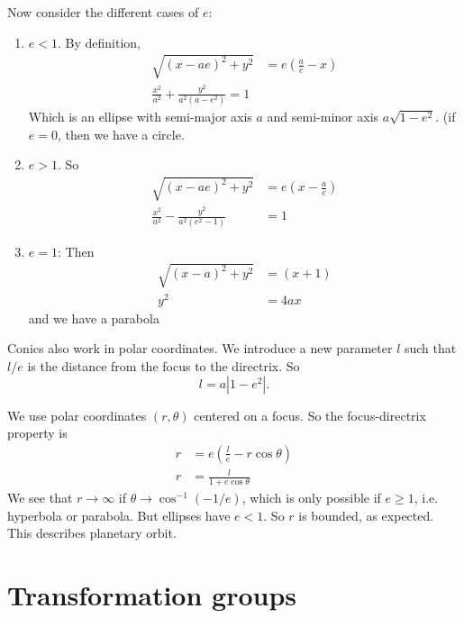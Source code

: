 \documentclass[a4paper]{article}
\begin{document}
Now consider the different cases of $e$:
\begin{enumerate}
\item $e < 1$. By definition,
  \begin{align*}
    \sqrt{(x - ae)^2 + y^2} &= e(\frac{a}{e} - x)\\
    \frac{x^2}{a^2} + \frac{y^2}{a^2(a - e^2)} = 1
  \end{align*}
  Which is an ellipse with semi-major axis $a$ and semi-minor axis $a\sqrt{1 - e^2}$. (if $e = 0$, then we have a circle.
\newpage %
\item $e > 1$. So
  \begin{align*}
    \sqrt{(x - ae)^2 + y^2} &= e(x - \frac{a}{e})\\
    \frac{x^2}{a^2} - \frac{y^2}{a^2(e^2 - 1)} &= 1
  \end{align*}
\item $e = 1$: Then
  \begin{align*}
    \sqrt{(x - a)^2 + y^2} &= (x + 1)\\
    y^2 &= 4ax
  \end{align*}
  and we have a parabola
\end{enumerate}

Conics also work in polar coordinates. We introduce a new parameter $l$ such that $l/e$ is the distance from the focus to the directrix. So
\[
l = a|1 - e^2|.
\]

We use polar coordinates $(r, \theta)$ centered on a focus. So the focus-directrix property is
\begin{align*}
  r &= e\left(\frac{l}{e} - r\cos\theta\right)\\
  r &= \frac{l}{1 + e\cos\theta}
\end{align*}
We see that $r\to \infty$ if $\theta \to \cos^{-1}(-1/e)$, which is only possible if $e\geq 1$, i.e. hyperbola or parabola. But ellipses have $e < 1$. So $r$ is bounded, as expected. This describes planetary orbit.

\section{Transformation groups}
\end{document}
